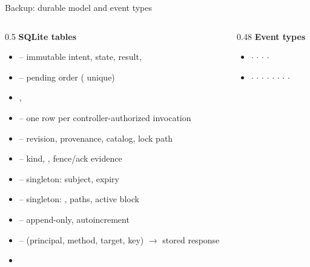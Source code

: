 \begin{frame}{Backup: durable model and event types}
    \footnotesize
    \begin{columns}[T]
        \begin{column}{0.5\textwidth}
            \textbf{SQLite tables} 
            \begin{itemize}
                \item {} -- immutable intent, state, result, 
                \item {} -- pending order ( unique)
                \item {}, 
                \item {} -- one row per controller-authorized invocation
                \item {} -- revision, provenance, catalog, lock path
                \item {} -- kind, , fence/ack evidence
                \item {} -- singleton: subject, expiry
                \item {} -- singleton: , paths, active block
                \item {} -- append-only,  autoincrement
                \item {} -- (principal, method, target, key) $\to$ stored response
                \item {}
            \end{itemize}
        \end{column}
        \begin{column}{0.48\textwidth}
            \textbf{Event types} 
            \begin{itemize}
                \item {}  $\cdot$  $\cdot$  $\cdot$  $\cdot$ 
                \item {}  $\cdot$  $\cdot$  $\cdot$ 
                      $\cdot$  $\cdot$  $\cdot$  $\cdot$  $\cdot$

\end{itemize}
\end{column}
\end{columns}
\end{frame}
